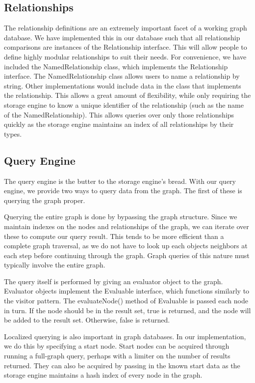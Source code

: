 \documentclass[11pt]{article}
\begin{document}
\subsection{Relationships}

The relationship definitions are an extremely important facet of a working graph database. We have implemented this in our database such that all relationship comparisons are instances of the Relationship interface. This will allow people to define highly modular relationships to suit their needs. For convenience, we have included the NamedRelationship class, which implements the Relationship interface. The NamedRelationship class allows users to name a relationship by string. Other implementations would include data in the class that implements the relationship. This allows a great amount of flexibility, while only requiring the storage engine to know a unique identifier of the relationship (such as the name of the NamedRelationship). This allows queries over only those relationships quickly as the storage engine maintains an index of all relationships by their types.

\subsection{Query Engine}

The query engine is the butter to the storage engine’s bread. With our query engine, we provide two ways to query data from the graph. The first of these is querying the graph proper.

Querying the entire graph is done by bypassing the graph structure. Since we maintain indexes on the nodes and relationships of the graph, we can iterate over these to compute our query result. This tends to be more efficient than a complete graph traversal, as we do not have to look up each objects neighbors at each step before continuing through the graph. Graph queries of this nature must typically involve the entire graph.

The query itself is performed by giving an evaluator object to the graph. Evaluator objects implement the Evaluable interface, which functions similarly to the visitor pattern. The evaluateNode() method of Evaluable is passed each node in turn. If the node should be in the result set, true is returned, and the node will be added to the result set. Otherwise, false is returned.

Localized querying is also important in graph databases. In our implementation, we do this by specifying a start node. Start nodes can be acquired through running a full-graph query, perhaps with a limiter on the number of results returned. They can also be acquired by passing in the known start data as the storage engine maintains a hash index of every node in the graph. 
\end{document}
